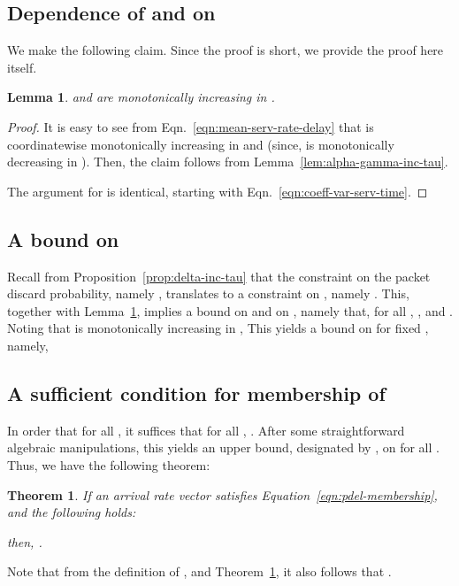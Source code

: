 \documentclass[12pt, draftclsnofoot, onecolumn]{IEEEtran}
\newtheorem{theorem}{Theorem}
\newtheorem{lemma}{Lemma}
\begin{document}
\subsection{Dependence of  and  on }

We make the following claim. Since the proof is short, we provide the proof here itself. 

\begin{lemma}
\label{lem:service-rate-inc-tau}
 and  are monotonically increasing in .
\end{lemma}
\begin{proof}
It is easy to see from Eqn.~\eqref{eqn:mean-serv-rate-delay} that  is coordinatewise monotonically increasing in  and  (since,  is monotonically decreasing in ). Then, the claim follows from Lemma~\ref{lem:alpha-gamma-inc-tau}. 

The argument for  is identical, starting with Eqn.~\eqref{eqn:coeff-var-serv-time}.
\end{proof}

\subsection{A bound on }
Recall from Proposition~\ref{prop:delta-inc-tau} that the constraint on the packet discard probability, namely , translates to a constraint on , namely . This, together with Lemma~\ref{lem:service-rate-inc-tau}, implies a bound on  and on , namely that, for all , , and . Noting that  is monotonically increasing in , This yields a bound on  for fixed , namely,



\subsection{A sufficient condition for membership of }

In order that  for all , it suffices that for all , . After some straightforward algebraic manipulations, this yields an upper bound, designated by , on  for all . Thus, we have the following theorem:
\begin{theorem}
\label{thm:membership-lambda-dmax}
If an arrival rate vector  satisfies Equation~\eqref{eqn:pdel-membership}, and the following holds:

then, . 
\end{theorem}

Note that from the definition of , and Theorem~\ref{thm:membership-lambda-dmax}, it also follows that . 
\end{document}
